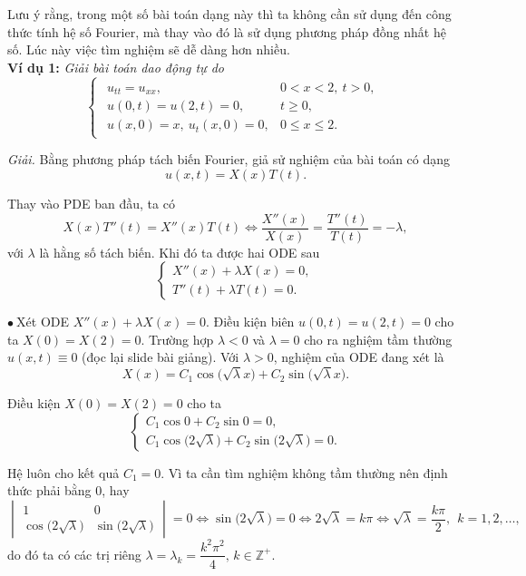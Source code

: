\documentclass[10pt, a4paper]{article}
\begin{document}
	Lưu ý rằng, trong một số bài toán dạng này thì ta không cần sử dụng đến công thức tính hệ số Fourier, mà thay vào đó là sử dụng phương pháp đồng nhất hệ số. Lúc này việc tìm nghiệm sẽ dễ dàng hơn nhiều.\\
	
	\textbf{Ví dụ 1:} \textit{Giải bài toán dao động tự do} $$\begin{cases}
		\begin{array}{ll}
			u_{tt}=u_{xx}, & 0<x<2,~t>0,\\
			u(0,t)=u(2,t)=0, & t\ge0,\\
			u(x,0)=x,~u_t(x,0)=0, & 0\le x\le 2.
		\end{array}
	\end{cases}$$
	
	\textit{Giải.} Bằng phương pháp tách biến Fourier, giả sử nghiệm của bài toán có dạng $$u(x,t)=X(x)T(t).$$
	
	Thay vào PDE ban đầu, ta có $$X(x)T''(t)=X''(x)T(t)\iff\frac{X''(x)}{X(x)}=\frac{T''(t)}{T(t)}=-\lambda,$$
	với $\lambda$ là hằng số tách biến. Khi đó ta được hai ODE sau $$\begin{cases}
		X''(x)+\lambda X(x)=0,\\
		T''(t)+\lambda T(t)=0.
	\end{cases}$$
	
	$\bullet~$Xét ODE $X''(x)+\lambda X(x)=0$. Điều kiện biên $u(0,t)=u(2,t)=0$ cho ta $X(0)=X(2)=0$. Trường hợp $\lambda<0$ và $\lambda=0$ cho ra nghiệm tầm thường $u(x,t)\equiv0$ (đọc lại slide bài giảng). Với $\lambda>0$, nghiệm của ODE đang xét là $$X(x)=C_1\cos\big(\sqrt\lambda x\big)+C_2\sin\big(\sqrt\lambda x\big).$$
	
	Điều kiện $X(0)=X(2)=0$ cho ta $$\begin{cases}
		C_1\cos0+C_2\sin0=0,\\
		C_1\cos\big(2\sqrt\lambda\big)+C_2\sin\big(2\sqrt\lambda\big)=0.
	\end{cases}$$
	
	Hệ luôn cho kết quả $C_1=0$. Vì ta cần tìm nghiệm không tầm thường nên định thức phải bằng 0, hay $$\begin{vmatrix}
		1&0\\
		\cos\big(2\sqrt\lambda\big)&\sin\big(2\sqrt\lambda\big)
	\end{vmatrix}=0\iff\sin\big(2\sqrt\lambda\big)=0\iff2\sqrt\lambda=k\pi\iff\sqrt\lambda=\frac{k\pi}{2},~~k=1,2,\ldots,$$
	do đó ta có các trị riêng $\lambda=\lambda_k=\dfrac{k^2\pi^2}{4},\,k\in\mathbb Z^+$.\\
	
\end{document}
